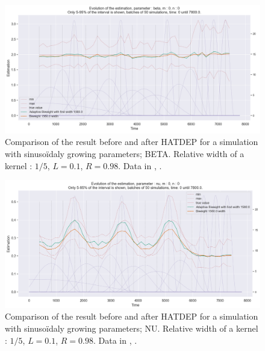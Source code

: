 \begin{figure}
\centering
\includegraphics[width = 0.90 \textwidth]{../imag/chap3/4/N.png}
\caption{Comparison of the result before and after HATDEP for a simulation with sinusoïdaly growing parameters; BETA. Relative width of a kernel : $1/5$, $L = 0.1$, $R = 0.98$. Data in \protect {}, \protect {}.}
\label{fig:first_estimate_4_beta}
\end{figure}

\begin{figure}
\centering
\includegraphics[width = 0.90 \textwidth]{../imag/chap3/4/O.png}
\caption{Comparison of the result before and after HATDEP for a simulation with sinusoïdaly growing parameters; NU. Relative width of a kernel : $1/5$, $L = 0.1$, $R = 0.98$. Data in \protect {}, \protect {} .}
\label{fig:first_estimate_4_nu}
\end{figure}



































